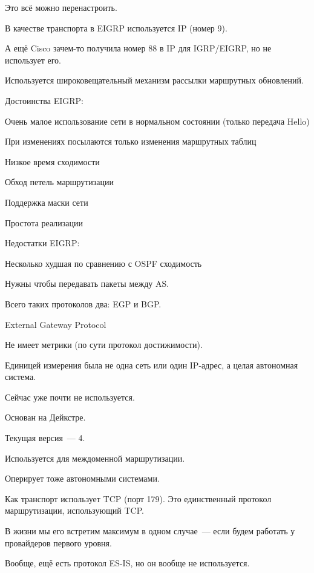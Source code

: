 Это всё можно перенастроить.

В качестве транспорта в EIGRP используется IP (номер 9).

А ещё Cisco зачем-то получила номер 88 в IP для IGRP/EIGRP, но не использует его.

Используется широковещательный механизм рассылки маршрутных обновлений.

Достоинства EIGRP:
\begin{MyItemize}
    \item Очень малое использование сети в нормальном состоянии (только передача Hello)
    \item При изменениях посылаются только изменения маршрутных таблиц
    \item Низкое время сходимости
    \item Обход петель маршрутизации
    \item Поддержка маски сети
    \item Простота реализации
\end{MyItemize}

Недостатки EIGRP:
\begin{MyItemize}
    \item Несколько худшая по сравнению с OSPF сходимость
\end{MyItemize}


Нужны чтобы передавать пакеты между AS.

Всего таких протоколов два: EGP и BGP.


External Gateway Protocol

Не имеет метрики (по сути протокол достижимости).

Единицей измерения была не одна сеть или один IP-адрес, а целая автономная система.

Сейчас уже почти не используется.


Основан на Дейкстре.

Текущая версия~--- 4.

Используется для междоменной маршрутизации.

Оперирует тоже автономными системами.

Как транспорт использует TCP (порт 179). Это единственный протокол маршрутизации, использующий TCP.

В жизни мы его встретим максимум в одном случае~--- если будем работать у провайдеров первого уровня.

Вообще, ещё есть протокол ES-IS, но он вообще не используется.

